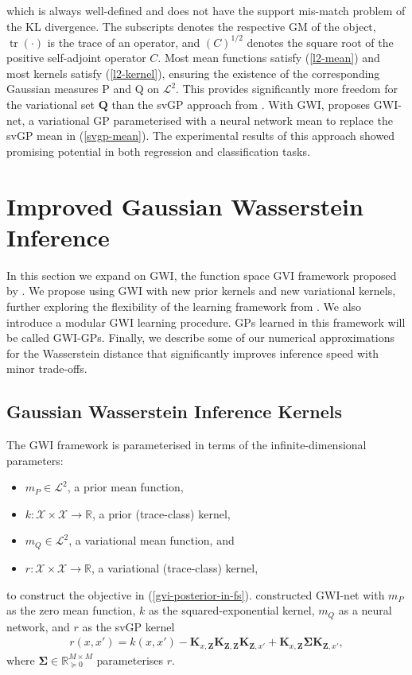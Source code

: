 \documentclass{article}
\newcommand{\tr}{\operatorname{tr}}
\numberwithin{equation}{section}
\begin{document}
which is always well-defined and does not have the support mis-match problem of the KL divergence. 
The subscripts denotes the respective GM of the object, $\tr(\cdot)$ is the trace of an operator, and $(C)^{1/2}$ denotes the square root of the positive self-adjoint operator $C$.
Most mean functions satisfy (\ref{l2-mean}) and most kernels satisfy (\ref{l2-kernel}), ensuring the existence of the corresponding Gaussian measures P and Q on $\mathcal{L}^2$.
This provides significantly more freedom for the variational set $\boldsymbol{Q}$ than the svGP approach from \cite{titsias2009variational}.
With GWI, \cite{wild2022generalized} proposes GWI-net, a variational GP parameterised with a neural network mean to replace the svGP mean in (\ref{svgp-mean}). 
The experimental results of this approach showed promising potential in both regression and classification tasks.

\newpage

\section{Improved Gaussian Wasserstein Inference}
In this section we expand on GWI, the function space GVI framework proposed by \cite{wild2022generalized}. 
We propose using GWI with new prior kernels and new variational kernels, further exploring the flexibility of the learning framework from \cite{wild2022generalized}. 
We also introduce a modular GWI learning procedure. 
GPs learned in this framework will be called GWI-GPs. 
Finally, we describe some of our numerical approximations for the Wasserstein distance that significantly improves inference speed with minor trade-offs.

\subsection{Gaussian Wasserstein Inference Kernels}
The GWI framework is parameterised in terms of the infinite-dimensional parameters:
\begin{itemize}
    \item $m_P \in \mathcal{L}^2$, a prior mean function,
    \item $k: \mathcal{X} \times \mathcal{X} \rightarrow \mathbb{R}$, a prior (trace-class) kernel,
    \item $m_Q \in \mathcal{L}^2$, a variational mean function, and
    \item $r: \mathcal{X} \times \mathcal{X} \rightarrow \mathbb{R}$, a variational (trace-class) kernel,
\end{itemize}
to construct the objective in (\ref{gvi-posterior-in-fs}). \cite{wild2022generalized} constructed GWI-net with $m_P$ as the zero mean function, $k$ as the squared-exponential kernel, $m_Q$ as a neural network, and $r$ as the svGP kernel 
\begin{align}
    r(x, x') = k(x, x') - \mathbf{K}_{x, \mathbf{Z}} \mathbf{K}_{\mathbf{Z}, \mathbf{Z}} \mathbf{K}_{\mathbf{Z}, x'} + \mathbf{K}_{x, \mathbf{Z}} \mathbf{\Sigma} \mathbf{K}_{\mathbf{Z}, x'},
    \label{gwi-svgp-kernel}
\end{align}
where $\mathbf{\Sigma} \in \mathbb{R}^{M \times M}_{\succcurlyeq 0}$ parameterises $r$. 
\end{document}
